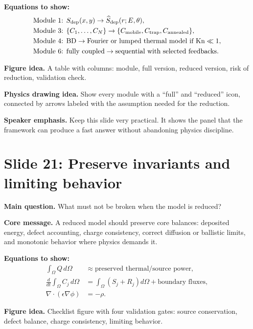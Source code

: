 \documentclass[11pt]{article}
\begin{document}
\textbf{Equations to show:}
\begin{align*}
\text{Module 1: }&S_{\mathrm{dep}}(x,y)\to \widehat{S}_{\mathrm{dep}}(r;E,\theta),\notag\\
\text{Module 3: }&\{C_1,\dots,C_N\}\to \{C_{\mathrm{mobile}},C_{\mathrm{trap}},C_{\mathrm{annealed}}\},\notag\\
\text{Module 4: }&\mathrm{BD}\to \text{Fourier or lumped thermal model if }\mathrm{Kn}\ll 1,\notag\\
\text{Module 6: }&\text{fully coupled}\to\text{sequential with selected feedbacks}.\notag
\end{align*}

\textbf{Figure idea.} A table with columns: module, full version, reduced version, risk of reduction, validation check.

\textbf{Physics drawing idea.} Show every module with a ``full'' and ``reduced'' icon, connected by arrows labeled with the assumption needed for the reduction.

\textbf{Speaker emphasis.} Keep this slide very practical. It shows the panel that the framework can produce a fast answer without abandoning physics discipline.

\section{Slide 21: Preserve invariants and limiting behavior}
\begin{physicsbox}
\textbf{Main question.} What must not be broken when the model is reduced?
\end{physicsbox}

\textbf{Core message.} A reduced model should preserve core balances: deposited energy, defect accounting, charge consistency, correct diffusion or ballistic limits, and monotonic behavior where physics demands it.

\textbf{Equations to show:}
\begin{align*}
\int_\Omega Q\,d\Omega &\approx \text{preserved thermal/source power},\\
\frac{d}{dt}\int_\Omega C_j\,d\Omega &= \int_\Omega \left(S_j+R_j\right)d\Omega + \text{boundary fluxes},\\
\nabla\cdot(\epsilon\nabla\phi)&=-\rho.
\end{align*}

\textbf{Figure idea.} Checklist figure with four validation gates: source conservation, defect balance, charge consistency, limiting behavior.
\end{document}
